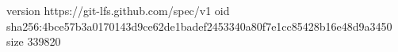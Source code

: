 version https://git-lfs.github.com/spec/v1
oid sha256:4bce57b3a0170143d9ce62de1badef2453340a80f7e1cc85428b16e48d9a3450
size 339820
